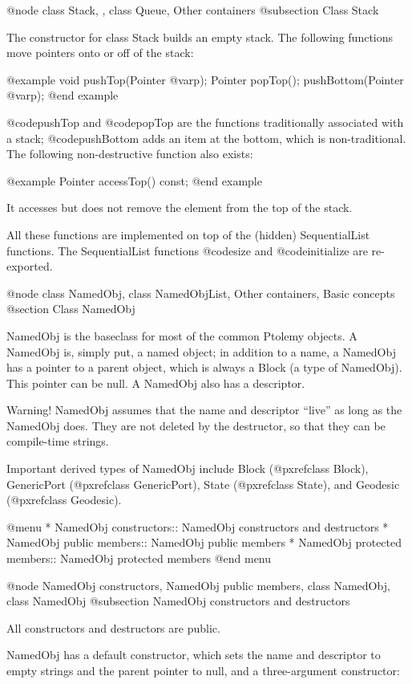 @node class Stack,  , class Queue, Other containers
@subsection Class Stack

The constructor for class Stack builds an empty stack.  The following
functions move pointers onto or off of the stack:

@example
void pushTop(Pointer @var{p});
Pointer popTop();
pushBottom(Pointer @var{p});
@end example

@code{pushTop} and @code{popTop} are the functions traditionally
associated with a stack; @code{pushBottom} adds an item at the bottom,
which is non-traditional.  The following non-destructive function
also exists:

@example
Pointer accessTop() const;
@end example

It accesses but does not remove the element from the top of the stack.

All these functions are implemented on top of the (hidden)
SequentialList functions.  The SequentialList functions @code{size} and
@code{initialize} are re-exported.

@node class NamedObj, class NamedObjList, Other containers, Basic concepts
@section Class NamedObj

NamedObj is the baseclass for most of the common Ptolemy objects.  A
NamedObj is, simply put, a named object; in addition to a name, a
NamedObj has a pointer to a parent object, which is always a Block (a
type of NamedObj).  This pointer can be null.  A NamedObj also has a
descriptor.

Warning!  NamedObj assumes that the name and descriptor ``live'' as long
as the NamedObj does.  They are not deleted by the destructor, so
that they can be compile-time strings.

Important derived types of NamedObj include
Block (@pxref{class Block}),
GenericPort (@pxref{class GenericPort}),
State (@pxref{class State}), and
Geodesic (@pxref{class Geodesic}).

@menu
* NamedObj constructors::       NamedObj constructors and destructors
* NamedObj public members::     NamedObj public members
* NamedObj protected members::  NamedObj protected members
@end menu

@node NamedObj constructors, NamedObj public members, class NamedObj, class NamedObj
@subsection NamedObj constructors and destructors

All constructors and destructors are public.

NamedObj has a default constructor, which sets the name and
descriptor to empty strings and the parent pointer to null, and a
three-argument constructor:

